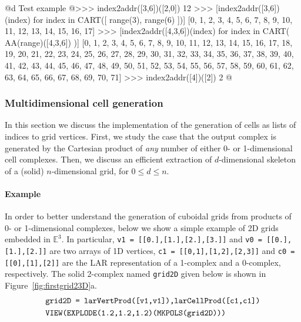 \documentclass[11pt,oneside]{article}	%
\def\E{\mathbb{E}}
\begin{document}
@d Test example 
@{>>> index2addr([3,6])([2,0])
12
>>> [index2addr([3,6])(index) for index in CART([ range(3), range(6) ])]
[0, 1, 2, 3, 4, 5, 6, 7, 8, 9, 10, 11, 12, 13, 14, 15, 16, 17]
>>> [index2addr([4,3,6])(index) for index in CART( AA(range)([4,3,6]) )]
[0, 1, 2, 3, 4, 5, 6, 7, 8, 9, 10, 11, 12, 13, 14, 15, 16, 17, 18, 19, 20, 
21, 22, 23, 24, 25, 26, 27, 28, 29, 30, 31, 32, 33, 34, 35, 36, 37, 38, 39, 
40, 41, 42, 43, 44, 45, 46, 47, 48, 49, 50, 51, 52, 53, 54, 55, 56, 57, 58, 
59, 60, 61, 62, 63, 64, 65, 66, 67, 68, 69, 70, 71]
>>> index2addr([4])([2])
2
@}

\subsubsection{Multidimensional cell generation}

In this section we discuss the implementation of the generation of cells as lists of indices to grid vertices. First, we study the case that the output complex is generated by the Cartesian product of \emph{any} number of either 0- or 1-dimensional cell complexes. Then, we discuss an efficient extraction of $d$-dimensional skeleton of a (solid) $n$-dimensional grid, for $0\leq d\leq n$.


\paragraph{Example}
In order to better understand the generation of cuboidal grids from products of 0- or 1-dimensional complexes, below we show a simple example of 2D grids embedded in $\E^3$.
In particular, \texttt{v1 = [[0.],[1.],[2.],[3.]]} and \texttt{v0 = [[0.],[1.],[2.]]} are two arrays of 1D vertices, \texttt{c1 = [[0,1],[1,2],[2,3]]} and \texttt{c0 = [[0],[1],[2]]} are the LAR representation of a 1-complex and a 0-complex, respectively. The solid 2-complex named \texttt{grid2D} given below is shown in Figure~\ref{fig:firstgrid23D}a.
\begin{align*}\scriptsize
&\texttt{grid2D = larVertProd([v1,v1]),larCellProd([c1,c1])}\\
&\texttt{VIEW(EXPLODE(1.2,1.2,1.2)(MKPOLS(grid2D)))}
\end{align*}
\end{document}

